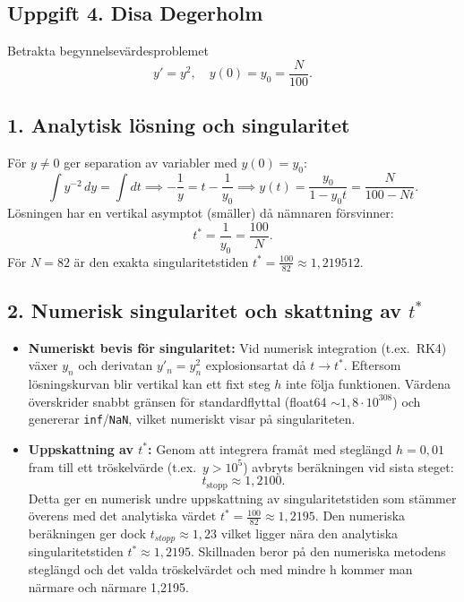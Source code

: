 \documentclass{article}
\begin{document}
\subsection*{Uppgift 4. Disa Degerholm}

Betrakta begynnelsevärdesproblemet
\begin{equation}
    y' = y^2, \quad y(0) = y_0 = \frac{N}{100}.
\end{equation}

\subsection*{1. Analytisk lösning och singularitet}
För $y \neq 0$ ger separation av variabler med $y(0) = y_0$:
\begin{equation}
    \int y^{-2}\,dy = \int dt \implies -\frac{1}{y} = t - \frac{1}{y_0} \implies y(t) = \frac{y_0}{1 - y_0 t} = \frac{N}{100 - N t}.
\end{equation}
Lösningen har en vertikal asymptot (smäller) då nämnaren försvinner:
\begin{equation}
    t^* = \frac{1}{y_0} = \frac{100}{N}.
\end{equation}
För $N = 82$ är den exakta singularitetstiden $t^* = \frac{100}{82} \approx 1{,}219512$.

\subsection*{2. Numerisk singularitet och skattning av $t^*$}
\begin{itemize}
    \item \textbf{Numeriskt bevis för singularitet:} 
    Vid numerisk integration (t.ex.\ RK4) växer $y_n$ och derivatan $y'_n = y_n^2$ explosionsartat då $t \to t^*$. Eftersom lösningskurvan blir vertikal kan ett fixt steg $h$ inte följa funktionen. Värdena överskrider snabbt gränsen för standardflyttal (float64 $\sim 1{,}8 \cdot 10^{308}$) och genererar \texttt{inf}/\texttt{NaN}, vilket numeriskt visar på singulariteten.

    \item \textbf{Uppskattning av $t^*$:}
    Genom att integrera framåt med steglängd $h = 0{,}01$ fram till ett tröskelvärde (t.ex.\ $y > 10^5$) avbryts beräkningen vid sista steget:
    \[
    t_{\text{stopp}} \approx 1{,}2100.
    \]
    Detta ger en numerisk undre uppskattning av singularitetstiden som stämmer överens med det analytiska värdet $t^* = \frac{100}{82} \approx 1{,}2195$. Den numeriska beräkningen ger dock $t_{stopp}\approx 1,23$ vilket ligger nära den analytiska singularitetstiden 
    $t^*\approx 1,2195$. Skillnaden beror på den numeriska metodens steglängd och det valda tröskelvärdet och med mindre h kommer man närmare och närmare 1,2195.
\end{itemize}
\end{document}
